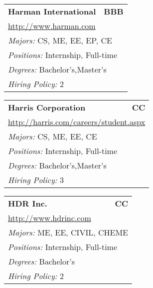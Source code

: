 \documentclass[twoside]{article}
\begin{document}
\begin{center}
\begin{multicols}{3}
\begin{FlushLeft}
\begin{minipage}{.9\columnwidth}
\end{minipage}
 
\begin{minipage}{.9\columnwidth}\begin{tabularx}{.95\columnwidth}{Xr}
                 {\Large\bf Harman International} & {\Large\bf BBB}\\
    \multicolumn{2}{p{.95\columnwidth}}{\url{http://www.harman.com}}\\
    \multicolumn{2}{p{.95\columnwidth}}{\emph{Majors:} CS, ME, EE, EP, CE}\\
    \multicolumn{2}{p{.95\columnwidth}}{\emph{Positions:} Internship, Full-time}\\
    \multicolumn{2}{p{.95\columnwidth}}{\emph{Degrees:} Bachelor's,Master's}\\
    \multicolumn{2}{p{.95\columnwidth}}{\emph{Hiring Policy:} 2}\\
    \end{tabularx}
    
\end{minipage}
 
\begin{minipage}{.9\columnwidth}\begin{tabularx}{.95\columnwidth}{Xr}
                 {\Large\bf Harris Corporation} & {\Large\bf CC}\\
    \multicolumn{2}{p{.95\columnwidth}}{\url{http://harris.com/careers/student.aspx}}\\
    \multicolumn{2}{p{.95\columnwidth}}{\emph{Majors:} CS, ME, EE, CE}\\
    \multicolumn{2}{p{.95\columnwidth}}{\emph{Positions:} Internship, Full-time}\\
    \multicolumn{2}{p{.95\columnwidth}}{\emph{Degrees:} Bachelor's,Master's}\\
    \multicolumn{2}{p{.95\columnwidth}}{\emph{Hiring Policy:} 3}\\
    \end{tabularx}
    
\end{minipage}
 
\begin{minipage}{.9\columnwidth}\begin{tabularx}{.95\columnwidth}{Xr}
                 {\Large\bf HDR Inc.} & {\Large\bf CC}\\
    \multicolumn{2}{p{.95\columnwidth}}{\url{http://www.hdrinc.com}}\\
    \multicolumn{2}{p{.95\columnwidth}}{\emph{Majors:} ME, EE, CIVIL, CHEME}\\
    \multicolumn{2}{p{.95\columnwidth}}{\emph{Positions:} Internship, Full-time}\\
    \multicolumn{2}{p{.95\columnwidth}}{\emph{Degrees:} Bachelor's}\\
    \multicolumn{2}{p{.95\columnwidth}}{\emph{Hiring Policy:} 2}\\
    \end{tabularx}
    

\end{minipage}
\end{FlushLeft}
\end{multicols}
\end{center}
\end{document}
